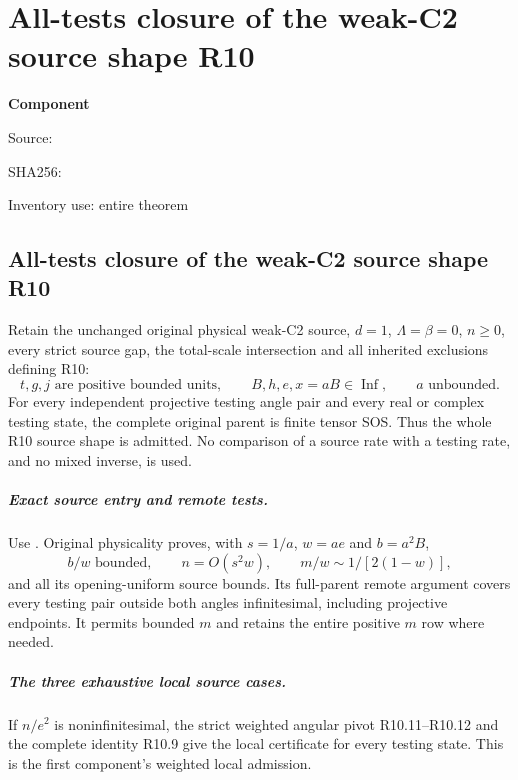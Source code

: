 \chapter{All-tests closure of the weak-C2 source shape R10}
\label{component:p526dc49d5fcb}
\noindent\textbf{Component }\par
{\small\noindent Source: \par}
{\small\noindent SHA256: \par}
{\small\noindent Inventory use: entire theorem\par}
\medskip
\section{All-tests closure of the weak-C2 source shape R10}
\begin{theorem}
Retain the unchanged original physical weak-C2 source, $d=1$,
$\Lambda=\beta=0$, $n\ge0$, every strict source gap, the total-scale
intersection and all inherited exclusions defining R10:
\[
 t,g,j\text{ are positive bounded units},\qquad
 B,h,e,x=aB\in\operatorname{Inf},\qquad a\text{ unbounded}.
\]
For every independent projective testing angle pair and every real or
complex testing state, the complete original parent is finite tensor
SOS. Thus the whole R10 source shape is admitted. No comparison of a
source rate with a testing rate, and no mixed inverse, is used.
\end{theorem}

\paragraph{Exact source entry and remote tests.}
Use .
Original physicality proves, with $s=1/a$, $w=ae$ and $b=a^2B$,
\[
 b/w\text{ bounded},\qquad n=O(s^2w),\qquad
 m/w\sim1/[2(1-w)],
\]
and all its opening-uniform source bounds. Its full-parent remote
argument covers every testing pair outside both angles infinitesimal,
including projective endpoints. It permits bounded $m$ and retains
the entire positive $m$ row where needed.

\paragraph{The three exhaustive local source cases.}
If $n/e^2$ is noninfinitesimal, the strict weighted angular pivot
R10.11--R10.12 and the complete identity R10.9 give the local
certificate for every testing state. This is the first component's
weighted local admission.

